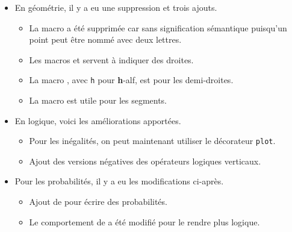 \documentclass[12pt,a4paper]{article}
\begin{document}
\begin{description}
\begin{itemize}[itemsep=.5em]
\begin{itemize}[itemsep=.5em]
    		\item Ajout de  pour rendre public l'opérateur intégral proposé par défaut par \LaTeX.
        \end{itemize}
    
    
        \item En géométrie, il y a eu une suppression et trois ajouts.
        \begin{itemize}[itemsep=.5em]
            \item La macro  a été supprimée car sans signification sémantique puisqu'un point peut être nommé avec deux lettres.
    
            \item Les macros  et  servent à indiquer des droites.
    
            \item La macro , avec \verb+h+ pour \textbf{h}-alf, est pour les demi-droites.
    
            \item La macro  est utile pour les segments.
        \end{itemize}
    
    
        \item En logique, voici les améliorations apportées.
        \begin{itemize}[itemsep=.5em]
            \item Pour les inégalités, on peut maintenant utiliser le décorateur \verb+plot+.
    
    		\item Ajout des versions négatives des opérateurs logiques verticaux.
        \end{itemize}
    
    
        \item Pour les probabilités, il y a eu les modifications ci-après.
        \begin{itemize}[itemsep=.5em]
            \item Ajout de  pour écrire des probabilités.
    
    		\item Le comportement de  a été modifié pour le rendre plus logique.
        \end{itemize}
    \end{itemize}


\end{description}
\end{document}
